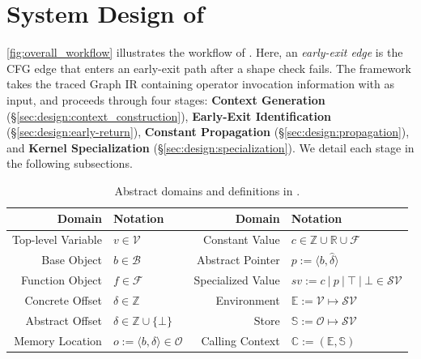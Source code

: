 \section{System Design of \mysys}
\label{sec:design}



\autoref{fig:overall_workflow} illustrates the workflow of \mysys.
Here, an \emph{early-exit edge} is the CFG edge that enters an early-exit path after a shape check fails.
The framework takes the traced Graph IR containing operator invocation information with \initialconsts as input, and proceeds through four stages: \textbf{Context Generation} (\S\ref{sec:design:context_construction}), \textbf{Early-Exit Identification} (\S\ref{sec:design:early-return}), \textbf{Constant Propagation} (\S\ref{sec:design:propagation}), and \textbf{Kernel Specialization} (\S\ref{sec:design:specialization}).
We detail each stage in the following subsections.

\begin{table}[htbp]
	\centering
	\small
	\renewcommand{\arraystretch}{1.05}
	\setlength{\tabcolsep}{5pt}
	\caption{Abstract domains and definitions in \mysys.}
	\label{fig:abstract-domain}
	\begin{tabular}{rl @{\hskip 0.8cm} rl}
		\toprule
		\textbf{Domain}    & \textbf{Notation}                                   & \textbf{Domain} & \textbf{Notation} \\
		\midrule
		Top-level Variable & $v \in \mathcal{V}$                                 &
		Constant Value     & $c \in \mathbb{Z} \cup \mathbb{R} \cup \mathcal{F}$                                       \\

		Base Object        & $b \in \mathcal{B}$                                 &
		Abstract Pointer   & $p := \langle b, \hat{\delta} \rangle$                                                    \\

		Function Object    & $f \in \mathcal{F}$                                 &
		Specialized Value  & $sv := c~|~p~|~\top~|~\bot \in \mathcal{SV}$                                              \\

		Concrete Offset    & $\delta \in \mathbb{Z}$                             &
		Environment        & $\mathbb{E} := \mathcal{V} \mapsto \mathcal{SV}$                                          \\

		Abstract Offset    & $\hat{\delta} \in \mathbb{Z} \cup \{ \bot \}$       &
		Store              & $\mathbb{S} := \mathcal{O} \mapsto \mathcal{SV}$                                          \\

		Memory Location    & $o := \langle b, \delta \rangle \in \mathcal{O}$    &
		Calling Context    & $\mathbb{C} := (\mathbb{E}, \mathbb{S})$                                                  \\
			\bottomrule
		\end{tabular}
\end{table}

